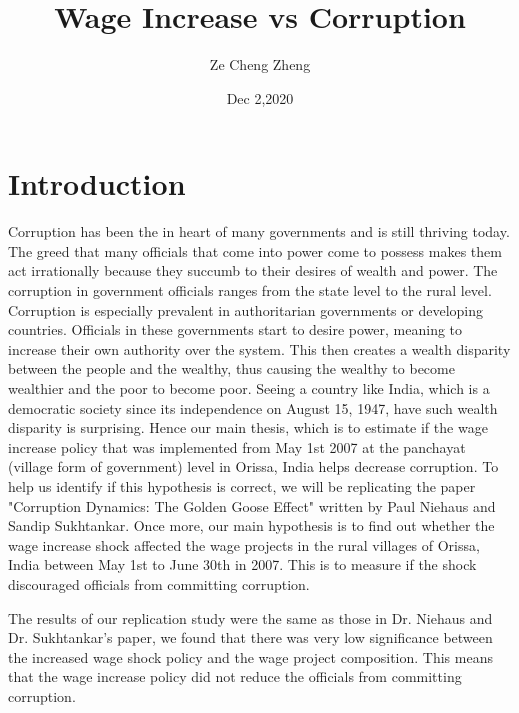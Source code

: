 \documentclass[12pt]{article}
\begin{document}
\title{\textbf{Wage Increase vs Corruption}}
\author{Ze Cheng Zheng}
\date{Dec 2,2020}
\maketitle


\section{Introduction}
Corruption has been the in heart of many governments and is still thriving today. The greed that many officials that come into power come to possess makes them act irrationally because they succumb to their desires of wealth and power. The corruption in government officials ranges from the state level to the rural level. Corruption is especially prevalent in authoritarian governments or developing countries. Officials in these governments start to desire power, meaning to increase their own authority over the system. This then creates a wealth disparity between the people and the wealthy, thus causing the wealthy to become wealthier and the poor to become poor. Seeing a country like India, which is a democratic society since its independence on August 15, 1947, have such wealth disparity is surprising. Hence our main thesis, which is to estimate if the wage increase policy that was implemented from May 1st 2007 at the panchayat (village form of government) level in Orissa, India helps decrease corruption. To help us identify if this hypothesis is correct, we will be replicating the paper "Corruption Dynamics: The Golden Goose Effect" written by Paul Niehaus and Sandip Sukhtankar. Once more, our main hypothesis is to find out whether the wage increase shock affected the wage projects in the rural villages of Orissa, India between May 1st to June 30th in 2007. This is to measure if the shock discouraged officials from committing corruption.  

The results of our replication study were the same as those in Dr. Niehaus and Dr. Sukhtankar’s paper, we found that there was very low significance between the increased wage shock policy and the wage project composition. This means that the wage increase policy did not reduce the officials from committing corruption.
\end{document}
